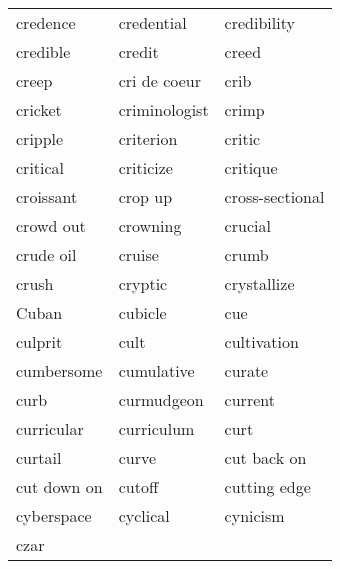 \documentclass{minimal}
\begin{document}
\begin{longtable}{p{2.8cm}p{2.8cm}p{2.8cm}}
credence & credential & credibility \\
credible & credit & creed \\
creep & cri de coeur & crib \\
cricket & criminologist & crimp \\
cripple & criterion & critic \\
critical & criticize & critique \\
croissant & crop up & cross-sectional \\
crowd out & crowning & crucial \\
crude oil & cruise & crumb \\
crush & cryptic & crystallize \\
Cuban & cubicle & cue \\
culprit & cult & cultivation \\
cumbersome & cumulative & curate \\
curb & curmudgeon & current \\
curricular & curriculum & curt \\
curtail & curve & cut back on \\
cut down on & cutoff & cutting edge \\
cyberspace & cyclical & cynicism \\
czar
\end{longtable}
\end{document}
